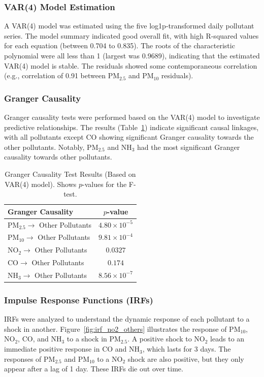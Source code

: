 \documentclass[fleqn,10pt]{SelfArx} %
\begin{document}
\subsubsection{VAR(4) Model Estimation}
A VAR(4) model was estimated using the five log1p-transformed daily pollutant series. The model summary indicated good overall fit, with high R-squared values for each equation (between 0.704 to 0.835). The roots of the characteristic polynomial were all less than 1 (largest was 0.9689), indicating that the estimated VAR(4) model is stable. The residuals showed some contemporaneous correlation (e.g., correlation of 0.91 between $\text{PM}_{2.5}$ and $\text{PM}_{10}$ residuals).

\subsubsection{Granger Causality}
Granger causality tests were performed based on the VAR(4) model to investigate predictive relationships. The results (Table~\ref{tab:granger_results}) indicate significant causal linkages, with all pollutants except CO showing significant Granger causality towards the other pollutants. Notably, $\text{PM}_{2.5}$ and $\text{NH}_3$ had the most significant Granger causality towards other pollutants.

\begin{table}[hbt]
\caption{Granger Causality Test Results (Based on VAR(4) model). Shows $p$-values for the F-test.}
\centering
\begin{tabular}{lc}
\toprule
Granger Causality & $p$-value \\
\midrule
$\mathrm{PM}_{2.5} \rightarrow$ Other Pollutants & $4.80 \times 10^{-5}$ \\
$\mathrm{PM}_{10} \rightarrow$ Other Pollutants & $9.81 \times 10^{-4}$ \\
$\mathrm{NO}_{2} \rightarrow$ Other Pollutants & $0.0327$ \\
$\mathrm{CO} \rightarrow$ Other Pollutants & $0.174$ \\
$\mathrm{NH}_{3} \rightarrow$ Other Pollutants & $8.56 \times 10^{-7}$ \\
\bottomrule
\end{tabular}
\label{tab:granger_results}
\end{table}

\subsubsection{Impulse Response Functions (IRFs)}
IRFs were analyzed to understand the dynamic response of each pollutant to a shock in another. Figure~\ref{fig:irf_no2_others} illustrates the response of $\text{PM}_{10}$, $\text{NO}_2$, CO, and $\text{NH}_3$ to a shock in $\text{PM}_{2.5}$. A positive shock to $\text{NO}_{2}$ leads to an immediate positive response in CO and $\text{NH}_{3}$, which lasts for 3 days. The responses of $\text{PM}_{2.5}$ and $\text{PM}_{10}$ to a $\text{NO}_{2}$ shock are also positive, but they only appear after a lag of 1 day. These IRFs die out over time.
\end{document}
